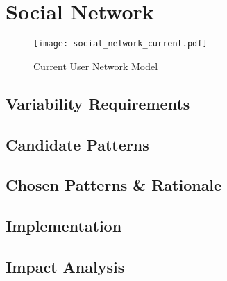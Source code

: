 \section{Social Network}\label{sec:fa_social_network}

\begin{figure}[H]
  \centering
  \texttt{[image: social\_network\_current.pdf]}
  \caption{Current User Network Model}
  \label{fig:social_network_current}
\end{figure}

\subsection{Variability Requirements}\label{sec:fa_social_network_variability_requirements}

\subsection{Candidate Patterns}\label{sec:fa_social_network_candidate_patterns}

\subsection{Chosen Patterns \& Rationale}\label{sec:fa_social_network_chosen_patterns_rationale}

\subsection{Implementation}\label{sec:fa_social_network_implementation}

\subsection{Impact Analysis}\label{sec:fa_social_network_impact_analysis}
